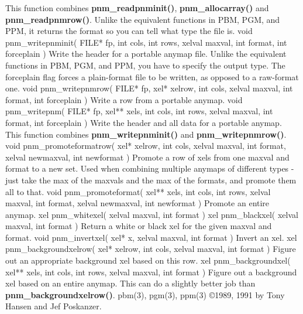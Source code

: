 This function combines
{\bf pnm\_readpnminit()}{\rm ,}
{\bf pnm\_allocarray()}
and
{\bf pnm\_readpnmrow()}{\rm .}
Unlike the equivalent functions in PBM, PGM, and PPM, it returns the format
so you can tell what type the file is.
\Ss
void pnm\_writepnminit( FILE* fp, int cols, int rows, xelval maxval, int format, int forceplain )
\Se
Write the header for a portable anymap file.
Unlike the equivalent functions in PBM, PGM, and PPM, you have to specify
the output type.
The forceplain flag forces a plain-format file to be written, as opposed
to a raw-format one.
\Ss
void pnm\_writepnmrow( FILE* fp, xel* xelrow, int cols, xelval maxval, int format, int forceplain )
\Se
Write a row from a portable anymap.
\Ss
void pnm\_writepnm( FILE* fp, xel** xels, int cols, int rows, xelval maxval, int format, int forceplain )
\Se
Write the header and all data for a portable anymap.
This function combines
{\bf pnm\_writepnminit()}
and
{\bf pnm\_writepnmrow()}{\rm .}
\Ss
void pnm\_promoteformatrow( xel* xelrow, int cols, xelval maxval, int format, xelval newmaxval, int newformat )
\Se
Promote a row of xels from one maxval and format to a new set.
Used when combining multiple anymaps of different types - just
take the max of the maxvals and the max of the formats, and
promote them all to that.
\Ss
void pnm\_promoteformat( xel** xels, int cols, int rows, xelval maxval, int format, xelval newmaxval, int newformat )
\Se
Promote an entire anymap.
\Ss
xel pnm\_whitexel( xelval maxval, int format )
xel pnm\_blackxel( xelval maxval, int format )
\Se
Return a white or black xel for the given maxval and format.
\Ss
void pnm\_invertxel( xel* x, xelval maxval, int format )
\Se
Invert an xel.
\Ss
xel pnm\_backgroundxelrow( xel* xelrow, int cols, xelval maxval, int format )
\Se
Figure out an appropriate background xel based on this row.
\Ss
xel pnm\_backgroundxel( xel** xels, int cols, int rows, xelval maxval, int format )
\Se
Figure out a background xel based on an entire anymap.
This can do a slightly better job than
{\bf pnm\_backgroundxelrow()}{\rm .}
pbm(3), pgm(3), ppm(3)
\copyright 1989, 1991 by Tony Hansen and Jef Poskanzer.
%
 
